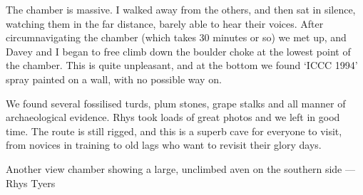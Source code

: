 The chamber is massive. I walked away from the others, and then sat in silence, watching them in the far distance, barely able to hear their voices. After circumnavigating the chamber (which takes 30 minutes or so) we met up, and Davey and I began to free climb down the boulder choke at the lowest point of the chamber. This is quite unpleasant, and at the bottom we found `ICCC 1994' spray painted on a wall, with no possible way on.

We found several fossilised turds, plum stones, grape stalks and all manner of archaeological evidence. Rhys took loads of great photos and we left in good time. The route is still rigged, and this is a superb cave for everyone to visit, from novices in training to old lags who want to revisit their glory days.


\begin{pagefigure}
\label{Ta Mokra}
\caption{  Another view \protect{} chamber showing a large, unclimbed aven on the southern side --- Rhys Tyers}
\end{pagefigure}




